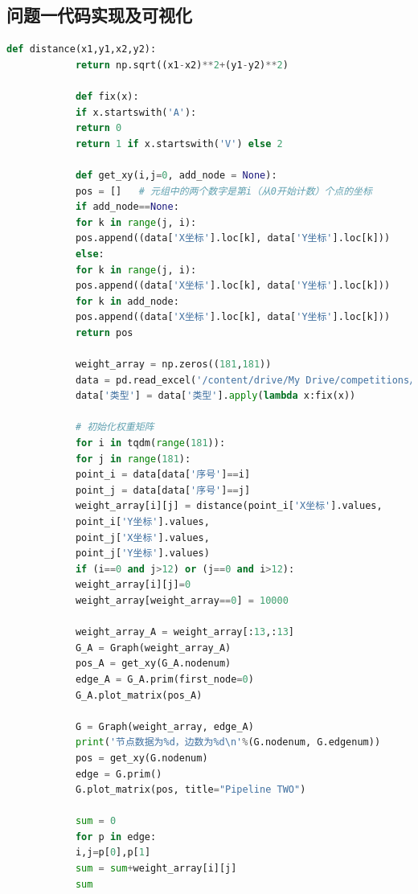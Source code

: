 \documentclass{whutmod}
\begin{document}
		\subsection*{问题一代码实现及可视化}
			\begin{lstlisting}[language=python]
			def distance(x1,y1,x2,y2):
			return np.sqrt((x1-x2)**2+(y1-y2)**2)
			
			def fix(x):
			if x.startswith('A'):
			return 0
			return 1 if x.startswith('V') else 2
			
			def get_xy(i,j=0, add_node = None):
			pos = []   # 元组中的两个数字是第i（从0开始计数）个点的坐标
			if add_node==None:
			for k in range(j, i):
			pos.append((data['X坐标'].loc[k], data['Y坐标'].loc[k]))
			else:
			for k in range(j, i):
			pos.append((data['X坐标'].loc[k], data['Y坐标'].loc[k]))
			for k in add_node:
			pos.append((data['X坐标'].loc[k], data['Y坐标'].loc[k]))
			return pos
			
			weight_array = np.zeros((181,181))
			data = pd.read_excel('/content/drive/My Drive/competitions/CMCM/demo1/data.xlsx')
			data['类型'] = data['类型'].apply(lambda x:fix(x))
			
			# 初始化权重矩阵
			for i in tqdm(range(181)):
			for j in range(181):
			point_i = data[data['序号']==i]
			point_j = data[data['序号']==j]
			weight_array[i][j] = distance(point_i['X坐标'].values,
			point_i['Y坐标'].values,
			point_j['X坐标'].values,
			point_j['Y坐标'].values)
			if (i==0 and j>12) or (j==0 and i>12):
			weight_array[i][j]=0
			weight_array[weight_array==0] = 10000
			
			weight_array_A = weight_array[:13,:13]
			G_A = Graph(weight_array_A)
			pos_A = get_xy(G_A.nodenum)
			edge_A = G_A.prim(first_node=0)
			G_A.plot_matrix(pos_A)
			
			G = Graph(weight_array, edge_A)
			print('节点数据为%d，边数为%d\n'%(G.nodenum, G.edgenum))
			pos = get_xy(G.nodenum)
			edge = G.prim()
			G.plot_matrix(pos, title="Pipeline TWO")
			
			sum = 0
			for p in edge:
			i,j=p[0],p[1]
			sum = sum+weight_array[i][j]
			sum
			\end{lstlisting}
			
\end{document}
